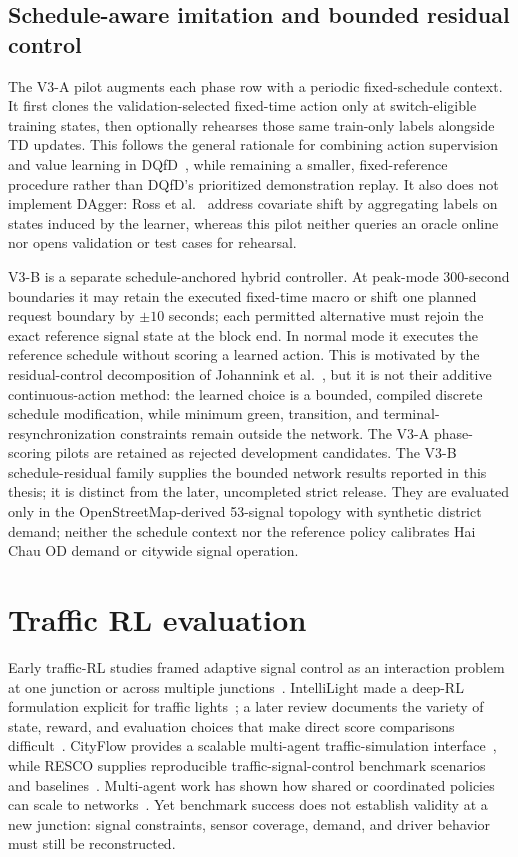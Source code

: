 \documentclass[12pt,a4paper]{report}
\begin{document}
\subsection{Schedule-aware imitation and bounded residual control}
The V3-A pilot augments each phase row with a periodic fixed-schedule context. It first clones the validation-selected fixed-time action only at switch-eligible training states, then optionally rehearses those same train-only labels alongside TD updates. This follows the general rationale for combining action supervision and value learning in DQfD~\cite{hester2018dqfd}, while remaining a smaller, fixed-reference procedure rather than DQfD's prioritized demonstration replay. It also does not implement DAgger: Ross et al.~\cite{ross2011dagger} address covariate shift by aggregating labels on states induced by the learner, whereas this pilot neither queries an oracle online nor opens validation or test cases for rehearsal.

V3-B is a separate schedule-anchored hybrid controller. At peak-mode 300-second boundaries it may retain the executed fixed-time macro or shift one planned request boundary by $\pm10$ seconds; each permitted alternative must rejoin the exact reference signal state at the block end. In normal mode it executes the reference schedule without scoring a learned action. This is motivated by the residual-control decomposition of Johannink et al.~\cite{johannink2019residual}, but it is not their additive continuous-action method: the learned choice is a bounded, compiled discrete schedule modification, while minimum green, transition, and terminal-resynchronization constraints remain outside the network. The V3-A phase-scoring pilots are retained as rejected development candidates. The V3-B schedule-residual family supplies the bounded network results reported in this thesis; it is distinct from the later, uncompleted strict release. They are evaluated only in the OpenStreetMap-derived 53-signal topology with synthetic district demand; neither the schedule context nor the reference policy calibrates Hai Chau OD demand or citywide signal operation.

\section{Traffic RL evaluation}
Early traffic-RL studies framed adaptive signal control as an interaction problem at one junction or across multiple junctions~\cite{abdulhai2003adaptive,arel2010marl}. IntelliLight made a deep-RL formulation explicit for traffic lights~\cite{wei2018intellilight}; a later review documents the variety of state, reward, and evaluation choices that make direct score comparisons difficult~\cite{miletic2022review}. CityFlow provides a scalable multi-agent traffic-simulation interface~\cite{zhang2019cityflow}, while RESCO supplies reproducible traffic-signal-control benchmark scenarios and baselines~\cite{ault2021resco}. Multi-agent work has shown how shared or coordinated policies can scale to networks~\cite{chu2020marl}. Yet benchmark success does not establish validity at a new junction: signal constraints, sensor coverage, demand, and driver behavior must still be reconstructed.
\end{document}
